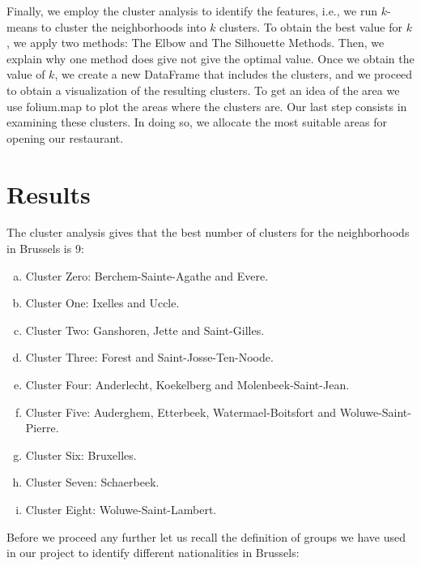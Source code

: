 \documentclass[a4paper,11pt]{amsart}
\begin{document}
Finally, we employ the cluster analysis to identify the features, i.e., we run $k$-means to cluster the neighborhoods into $k$ clusters. To obtain the best value for $k$, we apply two methods: The Elbow and The Silhouette Methods. Then, we explain why one method does give not give the optimal value. Once we obtain the value of $k$, we create a new DataFrame that includes the clusters, and we proceed to obtain a visualization of the resulting clusters. To get an idea of the area we use folium.map to plot the areas where the clusters are. Our last step consists in examining these clusters. In doing so, we allocate the most suitable areas for opening our restaurant.
\section{Results}\label{result}
The cluster analysis gives that the best number of clusters for the neighborhoods in Brussels is 9:
\begin{enumerate}[a)]
\item Cluster Zero: Berchem-Sainte-Agathe and Evere.
\item Cluster One: Ixelles and Uccle.
\item Cluster Two: Ganshoren, Jette and Saint-Gilles.
\item Cluster Three: Forest and Saint-Josse-Ten-Noode.
\item Cluster Four: Anderlecht, Koekelberg and Molenbeek-Saint-Jean.
\item Cluster Five: Auderghem, Etterbeek, Watermael-Boitsfort and Woluwe-Saint-Pierre.
\item Cluster Six: Bruxelles.
\item Cluster Seven: Schaerbeek.
\item Cluster Eight: Woluwe-Saint-Lambert.
\end{enumerate}
Before we proceed any further let us recall the definition of groups we have used in our project to identify different nationalities in Brussels:
\end{document}
